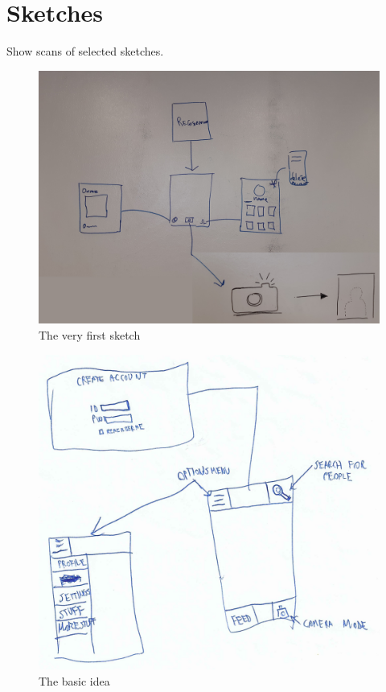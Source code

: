 \documentclass[12pt]{scrartcl}
\begin{document}
	
\section{Sketches}
	
	Show scans of selected sketches.
	
	\begin{figure}[H]
        		\centering
       		\includegraphics[width=\textwidth]{../images/design1.jpg}
       		\caption{The very first sketch}
        		\label{sketch1}
	\end{figure}
	
	\begin{figure}[H]
        		\centering
       		\includegraphics[width=\textwidth]{../images/design2.jpg}
       		\caption{The basic idea}
        		\label{sketch2}
	\end{figure}
	
\end{document}
